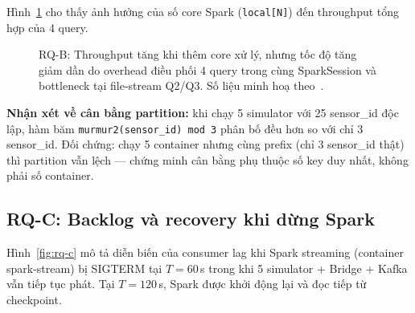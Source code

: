 Hình~\ref{fig:rq-b} cho thấy ảnh hưởng của số core Spark (\texttt{local[N]})
đến throughput tổng hợp của 4 query.

\begin{figure}[H]
\centering
{}
\caption[RQ-B: Throughput theo số core xử lý.]{RQ-B: Throughput tăng khi thêm core xử lý, nhưng tốc độ tăng giảm
dần do overhead điều phối 4 query trong cùng SparkSession và bottleneck tại
file-stream Q2/Q3. Số liệu minh hoạ
theo~\cite{kafka_patterns_benchmark_2025, shufflebench_2024}.}
\label{fig:rq-b}
\end{figure}

\textbf{Nhận xét về cân bằng partition:} khi chạy 5 simulator với 25
sensor\_id độc lập, hàm băm \texttt{murmur2(sensor\_id) mod 3} phân bố đều
hơn so với chỉ 3 sensor\_id. Đối chứng: chạy 5 container nhưng cùng prefix
(chỉ 3 sensor\_id thật) thì partition vẫn lệch --- chứng minh cân bằng phụ
thuộc số key duy nhất, không phải số container.

\subsection{RQ-C: Backlog và recovery khi dừng Spark}

Hình~\ref{fig:rq-c} mô tả diễn biến của consumer lag khi Spark streaming
(container spark-stream) bị SIGTERM tại $T = 60$\,s trong khi 5 simulator +
Bridge + Kafka vẫn tiếp tục phát. Tại $T = 120$\,s, Spark được khởi động
lại và đọc tiếp từ checkpoint.

